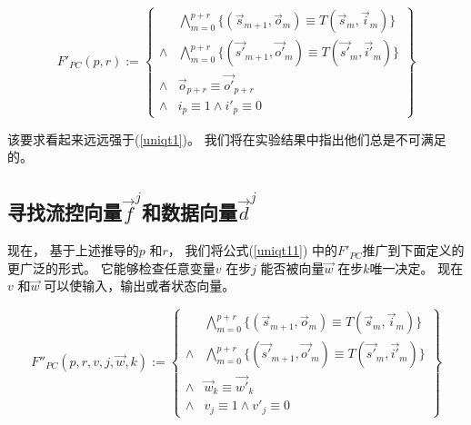 \begin{equation}\label{uniqt11}
F'_{PC}(p,r):=
\left\{
\begin{array}{cc}
&\bigwedge_{m=0}^{p+r}
\{
(\vec{s}_{m+1},\vec{o}_m)\equiv T(\vec{s}_m,\vec{i}_m)
\}
\\
\wedge&\bigwedge_{m=0}^{p+r}
\{
(\vec{s'}_{m+1},\vec{o'}_m)\equiv T(\vec{s'}_m,\vec{i'}_m)
\}
\\
\wedge&\vec{o}_{p+r}\equiv \vec{o'}_{p+r} \\
\wedge& i_{p}\equiv 1 \wedge  i'_{p}\equiv 0
\end{array}
\right\}
\end{equation}


该要求看起来远远强于(\ref{uniqt1})。
我们将在实验结果中指出他们总是不可满足的。



\subsection{寻找流控向量$\vec{f}^j$和数据向量$\vec{d}^j$}\label{subsec_inferstage}

现在，
基于上述推导的$p$ 和$r$，
我们将公式(\ref{uniqt11}) 中的$F'_{PC}$推广到下面定义的更广泛的形式。
它能够检查任意变量$v$ 在步$j$
能否被向量$\vec{w}$ 在步$k$唯一决定。
现在$v$ 和$\vec{w}$ 可以使输入，输出或者状态向量。

\begin{equation}\label{uniqt2}
F''_{PC}(p,r,v,j,\vec{w},k):=
\left\{
\begin{array}{cc}
&\bigwedge_{m=0}^{p+r}
\{
(\vec{s}_{m+1},\vec{o}_m)\equiv T(\vec{s}_m,\vec{i}_m)
\}
\\
\wedge&\bigwedge_{m=0}^{p+r}
\{
(\vec{s'}_{m+1},\vec{o'}_m)\equiv T(\vec{s'}_m,\vec{i'}_m)
\}
\\
\wedge&\vec{w}_{k}\equiv \vec{w'}_{k} \\
\wedge& v_{j}\equiv 1 \wedge  v'_{j}\equiv 0
\end{array}
\right\}
\end{equation}

